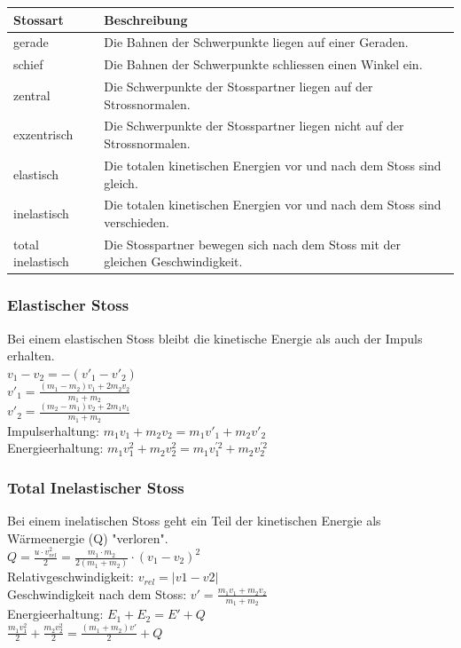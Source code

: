 \begin{tabular}[c]{|l|l|}
	\hline
	Stossart & Beschreibung \\
	\hline
	gerade & Die Bahnen der Schwerpunkte liegen auf einer Geraden. \\
	\hline
	schief & Die Bahnen der Schwerpunkte schliessen einen Winkel ein. \\
	\hline
	zentral & Die Schwerpunkte der Stosspartner liegen auf der Strossnormalen.  \\
	\hline
	exzentrisch & Die Schwerpunkte der Stosspartner liegen nicht auf der Strossnormalen.  \\
	\hline
	elastisch & Die totalen kinetischen Energien vor und nach dem Stoss sind gleich.  \\
		\hline
	inelastisch & Die totalen kinetischen Energien vor und nach dem Stoss sind verschieden.  \\
	\hline
	total inelastisch & Die Stosspartner bewegen sich nach dem Stoss mit der gleichen Geschwindigkeit.  \\
	\hline
\end{tabular}



\begin{multicols}{2}
\subsubsection{Elastischer Stoss}
Bei einem elastischen Stoss bleibt die kinetische Energie als auch der Impuls erhalten. \\
$v_1 - v_2 = -(v'_1 - v'_2)$ \\
$v'_1 = \frac{(m_1 - m_2)v_1 + 2m_2v_2}{m_1 + m_2} $ \\
$v'_2 = \frac{(m_2 - m_1)v_2 + 2m_1v_1}{m_1 + m_2}$ \\
Impulserhaltung: $m_1v_1 + m_2v_2 = m_1v'_1 + m_2v'_2$ \\
Energieerhaltung: $m_1v_1^2 + m_2v^2_2 = m_1v_1^{'2} + m_2v_2^{'2}$ \\
\columnbreak
\subsubsection{Total Inelastischer Stoss}
Bei einem inelatischen Stoss geht ein Teil der kinetischen Energie als Wärmeenergie (Q) "verloren". \\
$Q = \frac{u \cdot v_{rel}^2}{2} = \frac{m_1 \cdot m_2}{2(m_1 + m_2)} \cdot (v_1 - v_2)^2$ \\
Relativgeschwindigkeit: $v_{rel} = \lvert v1 - v2 \rvert$ \\
Geschwindigkeit nach dem Stoss: $v' = \frac{m_1v_1 + m_2v_2}{m_1 + m_2}$ \\
Energieerhaltung: $E_1 + E_2 = E' + Q$ \\
$ \frac{m_1v_1^2}{2} + \frac{m_2v_2^2}{2} = \frac{(m_1 + m_2)v'}{2} + Q$ \\
\end{multicols}

